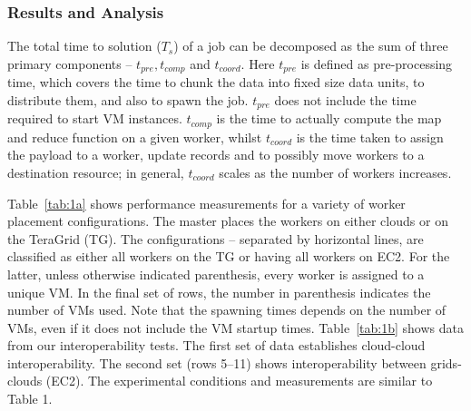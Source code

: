 \documentclass[3p,twocolumn]{elsarticle}
\begin{document}
\subsubsection*{Results and Analysis}

The total time to solution ($T_s$) of a \sagamapreduce job can be
decomposed as the sum of three primary components -- $t_{pre},
t_{comp}$ and $t_{coord}$.  Here $t_{pre}$ is defined as
pre-processing time, which covers the time to chunk the data into
fixed size data units, to distribute them, and also to spawn the job.
$t_{pre}$ does not include the time required to start VM instances.
$t_{comp}$ is the time to actually compute the map and reduce function
on a given worker, whilst $t_{coord}$ is the time taken to assign the
payload to a worker, update records and to possibly move workers to a
destination resource; in general, $t_{coord}$ scales as the number of
workers increases.

Table~\ref{tab:1a} shows performance measurements for a variety of
worker placement configurations.  The master places the workers on
either clouds or on the TeraGrid (TG). The configurations -- separated
by horizontal lines, are classified as either all workers on the TG or
having all workers on EC2. For the latter, unless otherwise indicated
parenthesis, every worker is assigned to a unique VM. In the final set
of rows, the number in parenthesis indicates the number of VMs used.
Note that the spawning times depends on the number of VMs, even if it
does not include the VM startup times.  Table~\ref{tab:1b} shows data
from our interoperability tests.  The first set of data establishes
cloud-cloud interoperability. The second set (rows 5--11) shows
interoperability between grids-clouds (EC2).  The experimental
conditions and measurements are similar to Table 1.
\end{document}
